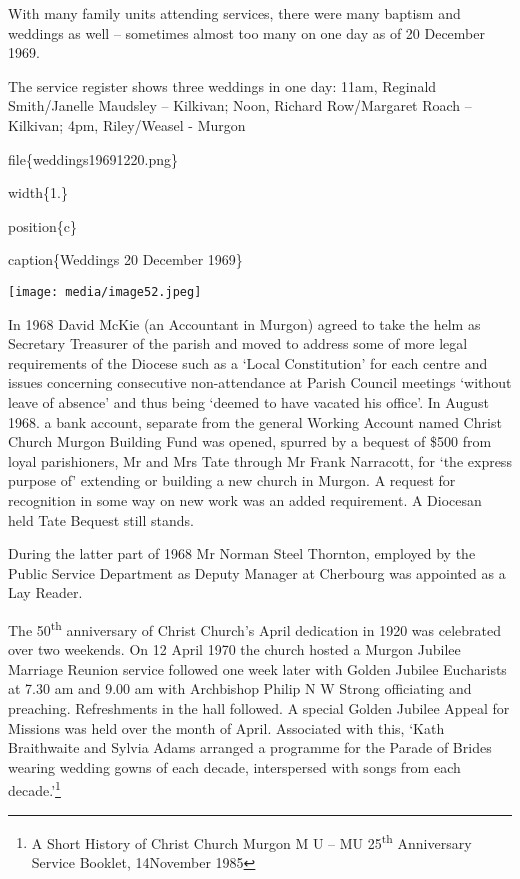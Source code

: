 With many family units attending services, there were many baptism and weddings as well -- sometimes almost too many on one day as of 20 December 1969.

The service register shows three weddings in one day: 11am, Reginald Smith/Janelle Maudsley -- Kilkivan; Noon, Richard Row/Margaret Roach -- Kilkivan; 4pm, Riley/Weasel - Murgon

file\{weddings19691220.png\}

width\{1.\}

position\{c\}

caption\{Weddings 20 December 1969\}

\texttt{[image: media/image52.jpeg]}

In 1968 David McKie (an Accountant in Murgon) agreed to take the helm as Secretary Treasurer of the parish and moved to address some of more legal requirements of the Diocese such as a `Local Constitution' for each centre and issues concerning consecutive non-attendance at Parish Council meetings `without leave of absence' and thus being `deemed to have vacated his office'. In August 1968. a bank account, separate from the general Working Account named Christ Church Murgon Building Fund was opened, spurred by a bequest of \$500 from loyal parishioners, Mr and Mrs Tate through Mr Frank Narracott, for `the express purpose of' extending or building a new church in Murgon. A request for recognition in some way on new work was an added requirement. A Diocesan held Tate Bequest still stands.

During the latter part of 1968 Mr Norman Steel Thornton, employed by the Public Service Department as Deputy Manager at Cherbourg was appointed as a Lay Reader.

The 50\textsuperscript{th} anniversary of Christ Church's April dedication in 1920 was celebrated over two weekends. On 12 April 1970 the church hosted a Murgon Jubilee Marriage Reunion service followed one week later with Golden Jubilee Eucharists at 7.30 am and 9.00 am with Archbishop Philip N W Strong officiating and preaching. Refreshments in the hall followed. A special Golden Jubilee Appeal for Missions was held over the month of April. Associated with this, `Kath Braithwaite and Sylvia Adams arranged a programme for the Parade of Brides wearing wedding gowns of each decade, interspersed with songs from each decade.'\footnote{A Short History of Christ Church Murgon M U -- MU 25\textsuperscript{th} Anniversary Service Booklet, 14November 1985}

